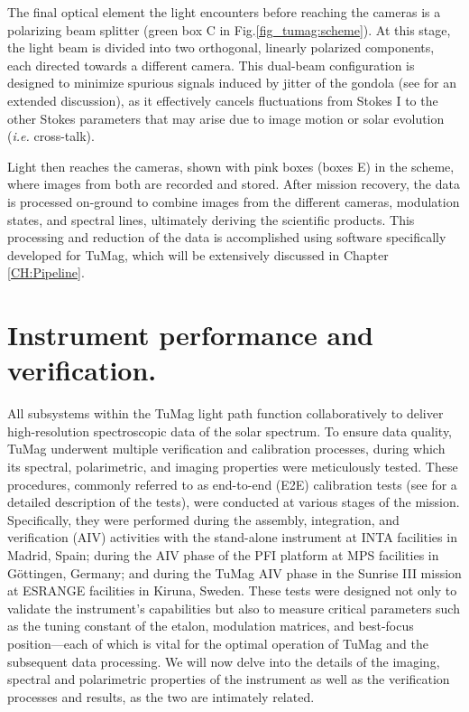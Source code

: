 The final optical element the light encounters before reaching the cameras is a polarizing beam splitter (green box C in Fig.\ref{fig_tumag:scheme}). At this stage, the light beam is divided into two orthogonal, linearly polarized components, each directed towards a different camera. This dual-beam configuration \citep{lites-doublebeam} is designed to minimize spurious signals induced by jitter of the gondola (see \cite{libro_JoseCarlos} for an extended discussion), as it effectively cancels fluctuations from Stokes I to the other Stokes parameters that may arise due to image motion or solar evolution (\textit{i.e.} cross-talk).

Light then reaches the cameras, shown with pink boxes (boxes E) in the scheme, where images from both are recorded and stored. After mission recovery, the data is processed on-ground to combine images from the different cameras, modulation states, and spectral lines, ultimately deriving the scientific products. This processing and reduction of the data is accomplished using software specifically developed for TuMag, which will be extensively discussed in Chapter \ref{CH:Pipeline}. 

\section{Instrument performance and verification.}

All subsystems within the TuMag light path function collaboratively to deliver high-resolution spectroscopic data of the solar spectrum. To ensure data quality, TuMag underwent multiple verification and calibration processes, during which its spectral, polarimetric, and imaging properties were meticulously tested. These procedures, commonly referred to as end-to-end (E2E) calibration tests (see \cite{e2e-tests-inta} for a detailed description of the tests), were conducted at various stages of the mission. Specifically, they were performed during the assembly, integration, and verification (AIV) activities with the stand-alone instrument at INTA facilities in Madrid, Spain; during the AIV phase of the PFI platform at MPS facilities in Göttingen, Germany; and during the TuMag AIV phase in the Sunrise III mission at ESRANGE facilities in Kiruna, Sweden. These tests were designed not only to validate the instrument's capabilities but also to measure critical parameters such as the tuning constant of the etalon, modulation matrices, and best-focus position—each of which is vital for the optimal operation of TuMag and the subsequent data processing. We will now delve into the details of the imaging, spectral and polarimetric properties of the instrument as well as the verification processes and results, as the two are intimately related.  

